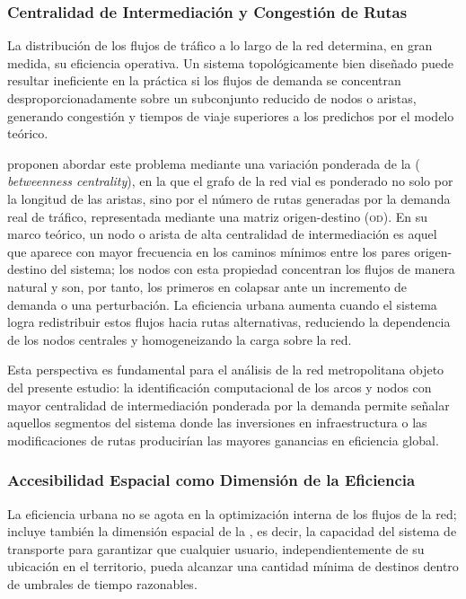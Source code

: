 \subsubsection{Centralidad de Intermediación y Congestión de Rutas}
\label{subsubsec:centralidad-intermediacion}

La distribución de los flujos de tráfico a lo largo de la red determina, en gran
medida, su eficiencia operativa. Un sistema topológicamente bien diseñado puede
resultar ineficiente en la práctica si los flujos de demanda se concentran
desproporcionadamente sobre un subconjunto reducido de nodos o aristas,
generando congestión y tiempos de viaje superiores a los predichos por el modelo
teórico.

\citet{batista2015} proponen abordar este problema mediante una variación
ponderada de la  (
\textit{betweenness centrality}), en la que el grafo de la red vial es ponderado
no solo por la longitud de las aristas, sino por el número de rutas generadas
por la demanda real de tráfico, representada mediante una matriz origen-destino
(\textsc{od}). En su marco teórico, un nodo o arista de alta centralidad de
intermediación es aquel que aparece con mayor frecuencia en los caminos mínimos
entre los pares origen-destino del sistema; los nodos con esta propiedad
concentran los flujos de manera natural y son, por tanto, los primeros en
colapsar ante un incremento de demanda o una perturbación. La eficiencia urbana
aumenta cuando el sistema logra redistribuir estos flujos hacia rutas
alternativas, reduciendo la dependencia de los nodos centrales y homogeneizando
la carga sobre la red.

Esta perspectiva es fundamental para el análisis de la red metropolitana objeto
del presente estudio: la identificación computacional de los arcos y nodos con
mayor centralidad de intermediación ponderada por la demanda permite señalar
aquellos segmentos del sistema donde las inversiones en infraestructura o las
modificaciones de rutas producirían las mayores ganancias en eficiencia global.

\subsubsection{Accesibilidad Espacial como Dimensión de la Eficiencia}
\label{subsubsec:accesibilidad-espacial}

La eficiencia urbana no se agota en la optimización interna de los flujos de la
red; incluye también la dimensión espacial de la , es
decir, la capacidad del sistema de transporte para garantizar que cualquier
usuario, independientemente de su ubicación en el territorio, pueda alcanzar una
cantidad mínima de destinos dentro de umbrales de tiempo razonables.

